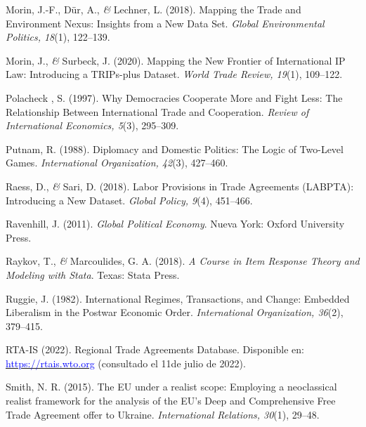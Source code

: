 \documentclass[a4paper]{tufte-handout}
\begin{document}
\begin{list}{}
\item{\small Morin, J.-F., Dür, A., {\itshape \&} Lechner, L. (2018). Mapping the Trade and Environment Nexus: Insights from a New Data Set. {\itshape Global Environmental Politics, 18}(1), 122--139.}

\item{\small Morin, J., {\itshape \&} Surbeck, J. (2020). Mapping the New Frontier of International IP Law: Introducing a TRIPs-plus Dataset. {\itshape World Trade Review, 19}(1), 109--122.}

\item{\small Polacheck , S. (1997). Why Democracies Cooperate More and Fight Less: The Relationship Between International Trade and Cooperation. {\itshape Review of International Economics, 5}(3), 295--309.}

\item{\small Putnam, R. (1988). Diplomacy and Domestic Politics: The Logic of Two-Level Games. {\itshape International Organization, 42}(3), 427--460.}

\item{\small Raess, D., {\itshape \&} Sari, D. (2018). Labor Provisions in Trade Agreements (LABPTA): Introducing a New Dataset. {\itshape Global Policy, 9}(4), 451--466.}

\item{\small Ravenhill, J. (2011). {\itshape Global Political Economy}. Nueva York: Oxford University Press.}

\item{\small Raykov, T., {\itshape \&} Marcoulides, G. A. (2018). {\itshape A Course in Item Response Theory and Modeling with Stata}. Texas: Stata Press.}

\item{\small Ruggie, J. (1982). International Regimes, Transactions, and Change: Embedded Liberalism in the Postwar Economic Order. {\itshape International Organization, 36}(2), 379--415.}

\item{\small RTA-IS (2022). Regional Trade Agreements Database. Disponible en: \\ \href{https://rtais.wto.org/UI/PublicMaintainRTAHome.aspx}{\textcolor{blue}{https://rtais.wto.org}} (consultado el 11de julio de 2022).}

\item{\small Smith, N. R. (2015). The EU under a realist scope: Employing a neoclassical realist framework for the analysis of the EU’s Deep and Comprehensive Free Trade Agreement offer to Ukraine. {\itshape International Relations, 30}(1), 29--48.}


\end{list}
\end{document}

